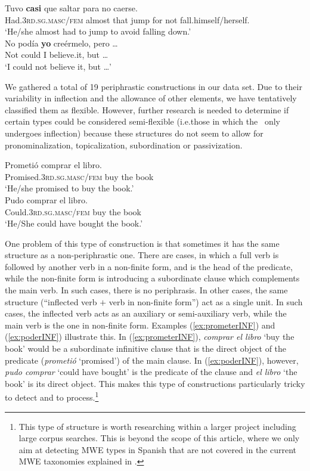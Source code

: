 \documentclass[output=paper]{langsci/langscibook}
\begin{document}
\begin{exe}
    \ex \label{ex:tuvoCasi}
	\gll Tuvo \textbf{casi} que saltar para no caerse.\\
	Had.\textsc{3rd.sg.masc/fem} almost that jump for not fall.himself/herself. \\
	\glt `He/she almost had to jump to avoid falling down.' \\
	\ex \label{ex:podiaSTO}
	\gll No podía \textbf{yo} creérmelo, pero \ldots\\
	Not could I believe.it, but \ldots \\
	\glt `I could not believe it, but \ldots'
\end{exe} 

We gathered a total of 19 periphrastic constructions in our data set.
Due to their variability in inflection and the allowance of other elements, we have tentatively classified them as flexible.
However, further research is needed to determine if certain types could be considered semi-flexible (i.e.\@ those in which the \mwe\ only undergoes inflection) because these structures do not seem to allow for pronominalization, topicalization, subordination or passivization.

\begin{exe}
    \ex \label{ex:prometerINF}
	\gll Prometió comprar el libro.\\
	{Promised.\textsc{3rd.sg.masc/fem}} buy the book \\
	\glt `He/she promised to buy the book.' \\
	\ex \label{ex:poderINF}
	\gll Pudo comprar el libro.\\
	{Could.\textsc{3rd.sg.masc/fem}} buy the book \\
	\glt `He/She could have bought the book.'
\end{exe} 

One problem of this type of construction is that sometimes it has the same structure as a non-periphrastic one.
There are cases, in which a full verb is followed by another verb in a non-finite form, and is the head of the predicate, while the non-finite form is introducing a subordinate clause which complements the main verb.
In such cases, there is no periphrasis.
In other cases, the same structure (``inflected verb $+$ verb in non-finite form'') act as a single unit.
In such cases, the inflected verb acts as an auxiliary or semi-auxiliary verb, while the main verb is the one in non-finite form.
Examples (\ref{ex:prometerINF}) and (\ref{ex:poderINF}) illustrate this.
In (\ref{ex:prometerINF}), \textit{comprar el libro} `buy the book' would be a subordinate infinitive clause that is the direct object of the predicate (\textit{prometió} `promised') of the main clause.
In (\ref{ex:poderINF}), however, \textit{pudo comprar} `could have bought' is the predicate of the clause and \textit{el libro} `the book' is its direct object.
This makes this type of constructions particularly tricky to detect and to process.\footnote{This type of structure is worth researching within a larger project including large corpus searches. This is beyond the scope of this article, where we only aim at detecting MWE types in Spanish that are not covered in the current MWE taxonomies explained in .}
\end{document}
